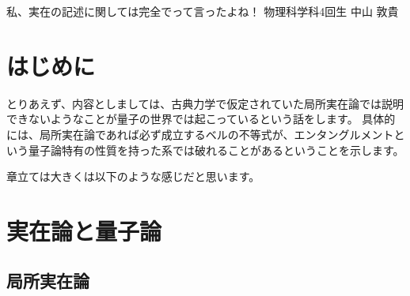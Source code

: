 \documentclass[10pt,b5paper,papersize,dvipdfmx]{jsbook}
\begin{document}

\newcommand\karizu[1]{\begin{center}（図：#1）\end{center}}

\newif\ifsecI
\newif\ifsecII

\toctrue
\secItrue
\secIItrue

\iftoc
  \setcounter{tocdepth}{2}
  \tableofcontents
  \setcounter{page}{0}
  \clearpage
\fi

\kaishititle%
  {私、実在の記述に関しては完全でって言ったよね！}%
  {物理科学科4回生}%
  {中山 敦貴}%


\section*{はじめに}
とりあえず、内容としましては、古典力学で仮定されていた局所実在論では説明できないようなことが量子の世界では起こっているという話をします。
具体的には、局所実在論であれば必ず成立するベルの不等式が、エンタングルメントという量子論特有の性質を持った系では破れることがあるということを示します。\par
章立ては大きくは以下のような感じだと思います。


\ifsecI
\section{実在論と量子論}

%
\subsection{局所実在論} %
\end{document}
